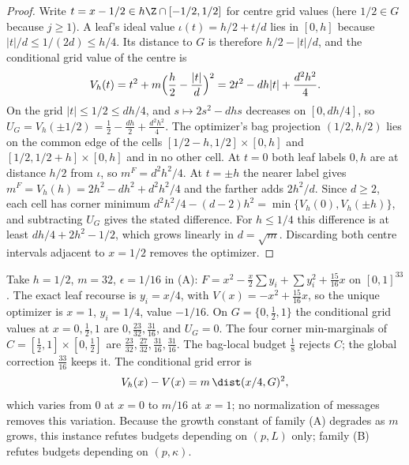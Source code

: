 \begin{proof}
Write $t=x-1/2\in h\Z\cap[-1/2,1/2]$ for centre grid values (here
$1/2\in G$ because $j\ge1$). A leaf's ideal value
$\iota(t)=h/2+t/d$ lies in $[0,h]$ because $|t|/d\le1/(2d)\le h/4$.
Its distance to $G$ is therefore $h/2-|t|/d$, and the conditional grid
value of the centre is
\[
V_h(t)=t^2+m\Bigl(\frac h2-\frac{|t|}d\Bigr)^2=2t^2-dh|t|+\frac{d^2h^2}4 .
\]
On the grid $|t|\le1/2\le dh/4$, and $s\mapsto2s^2-dhs$ decreases on
$[0,dh/4]$, so $U_G=V_h(\pm1/2)=\frac12-\frac{dh}2+\frac{d^2h^2}4$.
The optimizer's bag projection $(1/2,h/2)$ lies on the common edge of
the cells $[1/2-h,1/2]\times[0,h]$ and $[1/2,1/2+h]\times[0,h]$ and in no
other cell. At $t=0$ both leaf labels $0,h$ are at distance $h/2$ from
$\iota$, so $m^F=d^2h^2/4$. At $t=\pm h$ the nearer label gives
$m^F=V_h(h)=2h^2-dh^2+d^2h^2/4$ and the farther adds $2h^2/d$. Since
$d\ge2$, each cell has corner minimum $d^2h^2/4-(d-2)h^2
=\min\{V_h(0),V_h(\pm h)\}$, and subtracting $U_G$ gives the stated
difference. For $h\le1/4$ this difference is at least
$dh/4+2h^2-1/2$, which grows linearly in $d=\sqrt m$. Discarding both
centre intervals adjacent to $x=1/2$ removes the optimizer.
\end{proof}

\begin{example}\label{ex:cr-star32}
Take $h=1/2$, $m=32$, $\epsilon=1/16$ in (A):
$F=x^2-\frac x2\sum y_i+\sum y_i^2+\frac{15}{16}x$ on $[0,1]^{33}$.
The exact leaf recourse is $y_i=x/4$, with $V(x)=-x^2+\frac{15}{16}x$, so
the unique optimizer is $x=1$, $y_i=1/4$, value $-1/16$. On
$G=\{0,\frac12,1\}$ the conditional grid values at $x=0,\frac12,1$ are
$0,\frac{23}{32},\frac{31}{16}$, and $U_G=0$. The four corner
min-marginals of $C=[\frac12,1]\times[0,\frac12]$ are
$\frac{23}{32},\frac{27}{32},\frac{31}{16},\frac{31}{16}$. The bag-local
budget $\frac18$ rejects $C$; the global correction $\frac{33}{16}$ keeps it.
The conditional grid error is
\[
V_h(x)-V(x)=m\,\dist(x/4,G)^2,
\]
which varies from $0$ at $x=0$ to $m/16$ at $x=1$; no normalization of
messages removes this variation. Because the growth constant of family (A)
degrades as $m$ grows, this instance refutes budgets depending on
$(p,L)$ only; family (B) refutes budgets depending on $(p,\kappa)$.
\end{example}

